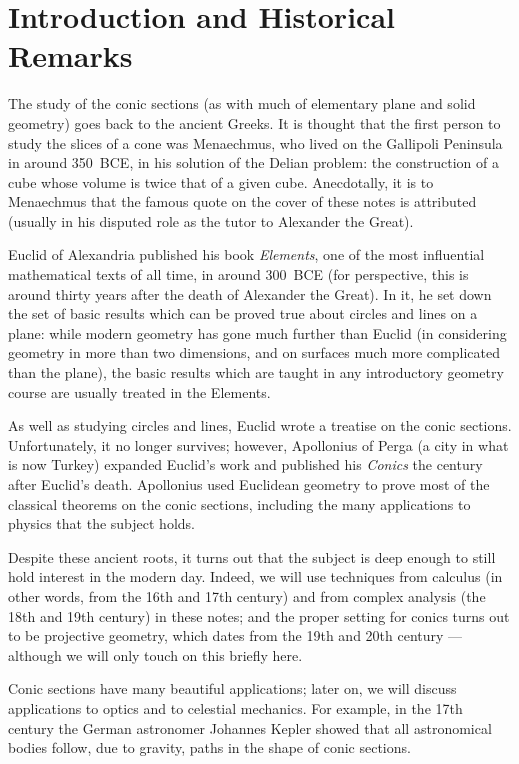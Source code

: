 \documentclass[a4paper,leqno,10pt]{article}
\theoremstyle{exercise}
\theoremstyle{plain}
\theoremstyle{definition}
\theoremstyle{remark}
\begin{document}
\section{Introduction and Historical Remarks}
The study of the conic sections (as with much of elementary plane and solid geometry) goes back to the ancient Greeks. It is
thought that the first person to study the slices of a cone was Menaechmus, who lived on the Gallipoli Peninsula in around 350~BCE,
in his solution of the Delian problem: the construction of a cube whose volume is twice that of a given cube. Anecdotally, it is to
Menaechmus that the famous quote on the cover of these notes is attributed (usually in his disputed role as the tutor to Alexander the Great).

Euclid of Alexandria published his book \emph{Elements}, one of the most influential mathematical texts of all time, in around
300~BCE (for perspective, this is around thirty years after the death of Alexander the Great). In it, he set down the set
of basic results which can be proved true about circles and lines on a plane: while modern geometry has gone much further than
Euclid (in considering geometry in more than two dimensions, and on surfaces much more complicated than the plane), the basic
results which are taught in any introductory geometry course are usually treated in the Elements.

As well as studying circles and lines, Euclid wrote a treatise on the conic sections. Unfortunately, it no longer survives;
however, Apollonius of Perga (a city in what is now Turkey) expanded Euclid's work and published his \emph{Conics} the century
after Euclid's death. Apollonius used Euclidean geometry to prove most of the classical theorems on the conic sections, including
the many applications to physics that the subject holds.

Despite these ancient roots, it turns out that the subject is deep enough to still hold interest in the modern day. Indeed, we
will use techniques from calculus (in other words, from the 16th and 17th century) and from complex analysis (the 18th and 19th
century) in these notes; and the proper setting for conics turns out to be projective geometry, which dates from the 19th and 20th
century --- although we will only touch on this briefly here.

Conic sections have many beautiful applications; later on, we will discuss applications to optics and to celestial mechanics. For
example, in the 17th century the German astronomer Johannes Kepler showed that all astronomical bodies follow, due to gravity,
paths in the shape of conic sections.
\end{document}
